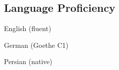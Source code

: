 \documentclass[../main.tex]{subfiles}
\begin{document}
\begin{category}
\section{Language Proficiency}
    \begin{enumerate*}[label=$\diamond$]
        \item English (fluent) \qquad \qquad \qquad
        \item German (Goethe C1) \qquad \qquad \qquad
        \item Persian (native) \qquad \qquad \qquad
    \end{enumerate*}
\end{category}
\end{document}
